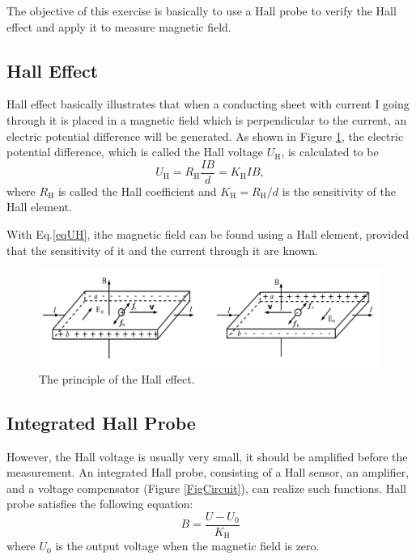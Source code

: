 \documentclass{article}
\begin{document}
The objective of this exercise is basically to use a Hall probe to verify the Hall effect and apply it to measure magnetic field.

	\subsection{Hall Effect}
	
Hall effect basically illustrates that when a conducting sheet with current I going through it is placed in a magnetic field which is perpendicular to the current, an electric potential difference will be generated. As shown in 
Figure \ref{FigPrinciple}, the electric potential difference, which is called the Hall voltage $U_\text{H}$, is calculated to be
\begin{equation}\label{eqUH}
U_\text{H} = R_\text{H}\frac{IB}{d} = K_\text{H}IB,
\end{equation}
where $R_\text{H}$ is called the Hall coefficient and $K_\text{H} = R_\text{H}/d$ is the sensitivity of the Hall element.

With Eq.\eqref{eqUH}, ithe magnetic field can be found using a Hall element, provided that the sensitivity of it and the current through it are known.
 
\begin{figure}[htbp]
\centering
\includegraphics[scale=0.7]{principle.png}
\caption{The principle of the Hall effect.}\label{FigPrinciple}
\end{figure}


	\subsection{Integrated Hall Probe}

However, the Hall voltage is usually very small, it should be amplified before the measurement. An integrated Hall probe, consisting of a Hall sensor, an amplifier, and a voltage compensator (Figure \ref{FigCircuit}), can realize such functions. Hall probe satisfies the following equation:
\begin{equation}\label{eqB}
B = \frac{U-U_0}{K_\text{H}}
\end{equation}
where $U_0$ is the output voltage when the magnetic field is zero.
\end{document}
